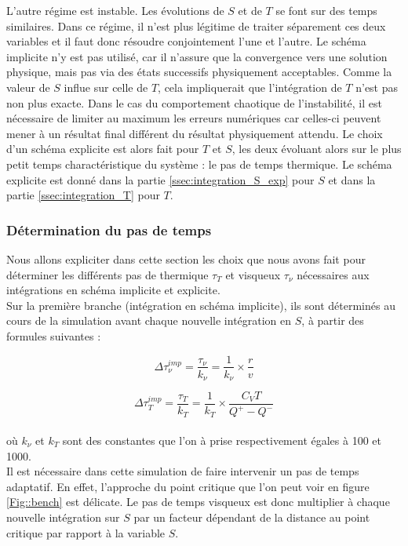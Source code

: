 L'autre régime est instable. Les évolutions de $S$ et de $T$ se font sur des temps similaires. Dans ce régime, il n'est plus légitime de traiter séparement ces deux variables et il faut donc résoudre conjointement l'une et l'autre. Le schéma implicite n'y est pas utilisé, car il n'assure que la convergence vers une solution physique, mais pas via des états successifs physiquement acceptables. Comme la valeur de $S$ influe sur celle de $T$, cela impliquerait que l'intégration de $T$ n'est pas non plus exacte. Dans le cas du comportement chaotique de l'instabilité, il est nécessaire de limiter au maximum les erreurs numériques car celles-ci peuvent mener à un résultat final différent du résultat physiquement attendu. Le choix d'un schéma explicite est alors fait pour $T$ et $S$, les deux évoluant alors sur le plus petit temps charactéristique du système : le pas de temps thermique. Le schéma explicite est donné dans la partie \ref{ssec:integration_S_exp} pour $S$ et dans la partie \ref{ssec:integration_T} pour $T$.

\subsubsection{Détermination du pas de temps\label{sec::pas_de_temps}}
Nous allons expliciter dans cette section les choix que nous avons fait pour déterminer les différents pas de thermique $\tau_T$ et visqueux $\tau_\nu$ nécessaires aux intégrations en schéma implicite et explicite. \\


Sur la première branche (intégration en schéma implicite), ils sont déterminés au cours de la simulation avant chaque nouvelle intégration en $S$, à partir des formules suivantes : 

\begin{equation}
	\Delta \tau_\nu^{imp} = \frac{\tau_\nu}{k_{\nu}} = \frac{1}{k_{\nu}} \times \frac{r}{v}
\end{equation}

\begin{equation}
	\Delta \tau_{T}^{imp} = \frac{\tau_{T}}{k_{T}}= \frac{1}{k_{T}} \times \frac{C_{V} T}{Q^{+} - Q^{-}}
\end{equation} \\

où $k_{\nu}$ et $k_{T}$ sont des constantes que l'on à prise respectivement égales à 100 et 1000. \\


Il est nécessaire dans cette simulation de faire intervenir un pas de temps adaptatif. En effet, l'approche du point critique que l'on peut voir en figure \ref{Fig::bench} est délicate. Le pas de temps visqueux est donc multiplier
à chaque nouvelle intégration sur $S$ par un facteur dépendant de la distance au point critique par rapport à la variable $S$. 


